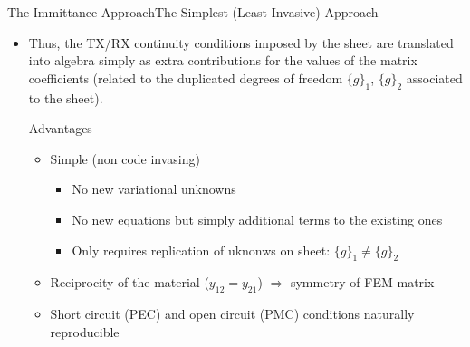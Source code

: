 \begin{frame}[allowframebreaks]{The Immittance Approach}{The Simplest (Least Invasive)
    Approach}
\begin{itemize}
    \begin{multline*}
      \int_{\Gamma} \vF_1\cdot(\normal \times ( {\bar{\bar{\mu_r}}}^{-1} \vnabla \times \vec{E}_1 )) d\Gamma = \\
      y_{11}\int_{\Gamma} \vF_1\cdot(\normal  \times \vec{E}_1 )) d\Gamma
      + y_{12}\int_{\Gamma} \vF_1\cdot(\normal  \times \vec{E}_2 )) d\Gamma
    \end{multline*}
    \begin{multline*}
      \int_{\Gamma} \vF_2\cdot(\normal \times ( {\bar{\bar{\mu_r}}}^{-1} \vnabla \times \vec{E}_2 )) d\Gamma = \\
      y_{21}\int_{\Gamma} \vF_2\cdot(\normal  \times \vec{E}_1 )) d\Gamma
      + y_{22}\int_{\Gamma} \vF_2\cdot(\normal  \times \vec{E}_2 )) d\Gamma
    \end{multline*}
    where $\normal\times\vF_1=\normal\times\vF_2$ (conformal mesh
    above-below the sheet).

 
  \item Thus, the TX/RX continuity conditions imposed by the sheet are
    translated into algebra simply as extra contributions for the
    values of the matrix coefficients (related to the duplicated
    degrees of freedom $\lbrace g\rbrace_1$, $\lbrace g\rbrace_2$
    associated to the sheet).

    \begin{block}{Advantages}
      \begin{itemize}
      \item Simple (non code invasing)
        \begin{itemize}
        \item No new variational unknowns
        \item No new equations but simply additional terms to the
          existing ones
        \item Only requires replication of uknonws on sheet:
          $\lbrace g\rbrace_1\ne\lbrace g\rbrace_2$
        \end{itemize}
      \item Reciprocity of the material ($y_{12}=y_{21}$)
        $\Rightarrow$ symmetry of FEM matrix
      \item Short circuit (PEC) and open circuit (PMC) conditions
        naturally reproducible
      \end{itemize}
    \end{block}


\end{itemize}
\end{frame}
